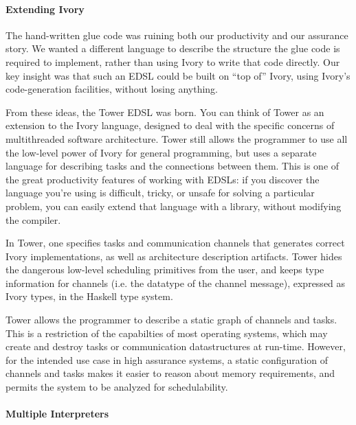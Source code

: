 \paragraph{Extending Ivory}
The hand-written glue code was ruining both our productivity and our assurance
story. We wanted a different language to describe the structure the glue code
is required to implement, rather than using Ivory to write that code directly.
Our key insight was that such an EDSL could be built on ``top of'' Ivory, using
Ivory's code-generation facilities, without losing anything.

From these ideas, the Tower EDSL was born. You can think of Tower as an
extension to the Ivory language, designed to deal with the specific concerns of
multithreaded software architecture. Tower still allows the programmer to use
all the low-level power of Ivory for general programming, but uses a separate
language for describing tasks and the connections between them.  This is one of
the great productivity features of working with EDSLs: if you discover the
language you're using is difficult, tricky, or unsafe for solving a particular
problem, you can easily extend that language with a library, without modifying
the compiler.

In Tower, one specifies tasks and communication channels that generates correct
Ivory implementations, as well as architecture description artifacts. Tower
hides the dangerous low-level scheduling primitives from the user, and keeps
type information for channels (i.e. the datatype of the channel message),
expressed as Ivory types, in the Haskell type system.

Tower allows the programmer to describe a static graph of channels and tasks.
This is a restriction of the capabilties of most operating systems, which may
create and destroy tasks or communication datastructures at run-time. However,
for the intended use case in high assurance systems, a static configuration of
channels and tasks makes it easier to reason about memory requirements, and
permits the system to be analyzed for schedulability.

\paragraph{Multiple Interpreters}


